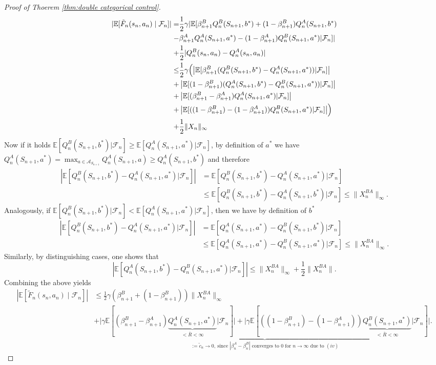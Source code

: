 \documentclass{article}
\newcommand{\cA}{\mathcal{A}}
\newcommand{\cF}{\mathcal{F}}
\newcommand{\E}{\mathbb{E}}
\theoremstyle{plain}
\theoremstyle{definition}
\theoremstyle{remark}
\begin{document}
\begin{proof}[Proof of Thoerem \ref{thm:double categorical control}]
    \begin{align*}
        |\E[\tilde F_n(s_n,a_n)\mid\cF_n]|=&\frac{1}{2}\gamma|\E[\beta_{n+1}^BQ^B_n(S_{n+1},b^*)+(1-\beta^B_{n+1})Q^A_n(S_{n+1},b^*)\\
        -&\beta_{n+1}^AQ^A_n(S_{n+1},a^*)-(1-\beta^A_{n+1})Q^B_n(S_{n+1},a^*)|\cF_n]|\\
        +&\frac{1}{2}|Q^B_n(s_n,a_n)- Q^A_n(s_n,a_n)|\\
            \leq &\frac{1}{2} \gamma \Bigl(\left|\E[\beta^B_{n+1}(Q^B_n(S_{n+1},b^*)-Q^A_n(S_{n+1},a^*))|\cF_n]\right|\\
        +&\left|\E[(1-\beta^B_{n+1})(Q^A_n(S_{n+1},b^*)-Q^B_n(S_{n+1},a^*))|\cF_n]\right|\\
        +&\left|\E[(\beta_{n+1}^B-\beta_{n+1}^A)Q^A_n(S_{n+1},a^*)|\cF_n]\right|\\
        +&\left|\E[((1-\beta^B_{n+1})-(1-\beta^A_{n+1}))Q^B_n(S_{n+1},a^*)|\cF_n]\right|\Bigr)\\
        +&\frac{1}{2}\|X_n\|_\infty
    \end{align*}
    Now if it holds $\E[Q^B_n(S_{n+1},b^*)|\cF_n]\geq\E[Q^A_n(S_{n+1},a^*)|\cF_n]$, by definition of $a^*$ we have $Q^A_n(S_{n+1},a^*)=\max_{a\in\cA_{S_{n+1}}}Q^A_n(S_{n+1},a)\geq Q^A_n(S_{n+1},b^*)$ and therefore
    \begin{align*}
        \left|\E[Q^B_n(S_{n+1},b^*)-Q^A_n(S_{n+1},a^*)|\cF_n]\right|&=\E[Q^B_n(S_{n+1},b^*)-Q^A_n(S_{n+1},a^*)|\cF_n]\\
        &\leq\E[Q^B_n(S_{n+1},b^*)-Q^A_n(S_{n+1},b^*)|\cF_n]\leq\|X^{BA}_n\|_\infty.
    \end{align*}
    Analogously, if $\E[Q^B_n(S_{n+1},b^*)|\cF_n]<\E[Q^A_n(S_{n+1},a^*)|\cF_n]$, then we have by definition of $b^*$
    \begin{align*}
        \left|\E[Q^B_n(S_{n+1},b^*)-Q^A_n(S_{n+1},a^*)|\cF_n]\right|&=\E[Q^A_n(S_{n+1},a^*)-Q^B_n(S_{n+1},b^*)|\cF_n]\\
        &\leq\E[Q^A_n(S_{n+1},a^*)-Q^B_n(S_{n+1},a^*)|\cF_n]\leq\|X^{BA}_n\|_\infty.
    \end{align*}
    Similarly, by distinguishing cases, one shows that
    \[\left|\E[Q^A_n(S_{n+1},b^*)-Q^B_n(S_{n+1},a^*)|\cF_n]\right|\leq\|X^{BA}_n\|_\infty+\frac{1}{2}\|X^{BA}_n\|.\]
    Combining the above yields
    \begin{align*}
        \left|\E[\tilde F_n(s_n,a_n)\mid\cF_n]\right|&\leq\frac{1}{2}\gamma(\beta^B_{n+1}+(1-\beta^B_{n+1}))\|X^{BA}_n\|_\infty\\        &+\underbrace{\Big|\gamma\E[(\beta_{n+1}^B-\beta_{n+1}^A)\underbrace{Q^A_n(S_{n+1},a^*)}_{<\bar R<\infty}|\cF_n]\Big|+\Big|\gamma\E[((1-\beta^B_{n+1})-(1-\beta^A_{n+1}))\underbrace{Q^B_n(S_{n+1},a^*)}_{<\bar R<\infty}|\cF_n]\Big|}_{:=\tilde c_n  \to 0,\ \text{since } |\beta^A_n-\beta^B_n| \text{ converges to 0 for }n\to\infty\text{ due to }(iv)}.

\end{align*}
\end{proof}
\end{document}
